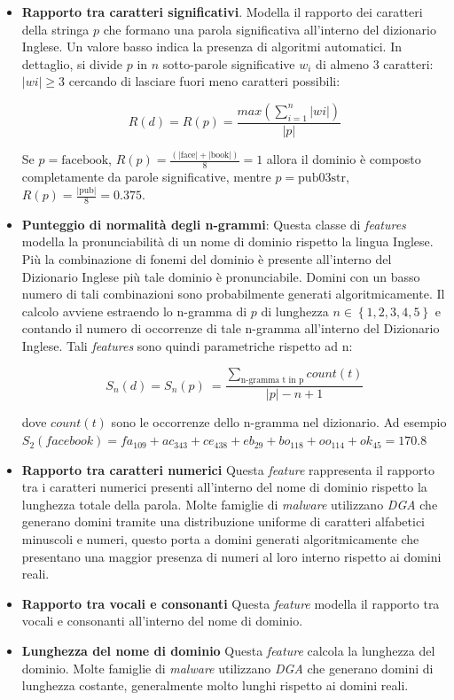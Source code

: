 \begin{itemize}

\item \textbf{Rapporto tra caratteri significativi}. Modella il rapporto dei caratteri della stringa $p$ che formano una parola significativa all'interno del dizionario Inglese. Un valore basso indica la presenza di algoritmi automatici. In dettaglio, si divide $p$ in $n$ sotto-parole significative $w_i$ di almeno $3$ caratteri: $|wi| \ge 3$ cercando di lasciare fuori meno caratteri possibili: 

\[R(d) = R(p) = \frac{max(\sum_{i=1}^n |wi|)}{\left | p \right |}\] 

Se $p = \text{facebook}$, $R(p) = \frac{(|\text{face}| + |\text{book}|)}{8} = 1$ allora il dominio è composto completamente da parole significative, mentre $p = \text{pub03str}$, $R(p) = \frac{|\text{pub}|}{8} = 0.375$. 

    

\item \textbf{Punteggio di normalità degli n-grammi}: Questa classe di \textit{features} modella la pronunciabilità di un nome di dominio rispetto la lingua Inglese. Più la combinazione di fonemi del dominio è presente  all'interno del Dizionario Inglese più tale dominio è pronunciabile. Domini con un basso numero di tali combinazioni sono probabilmente generati algoritmicamente. Il calcolo avviene estraendo lo n-gramma di $p$ di lunghezza $n \in \left \{1, 2, 3, 4, 5 \right \}$ e contando il numero di occorrenze di tale n-gramma all'interno del Dizionario Inglese. Tali \textit{features} sono quindi parametriche rispetto ad n:
 
\[S_n(d) = S_n(p) \:= \frac{\sum_{\text{n-gramma t in p}} count(t)}{\left | p \right | - n + 1}\] 

dove $count(t)$ sono le occorrenze dello n-gramma nel dizionario. Ad esempio $S_2(facebook) = fa_{109} + ac_{343} + ce_{438} + eb_{29} + bo_{118} + oo_{114} + ok_{45} = 170.8$

       
\item \textbf{Rapporto tra caratteri numerici} Questa \textit{feature} rappresenta il rapporto tra i caratteri numerici presenti all'interno del nome di dominio rispetto la lunghezza totale della parola. Molte famiglie di \textit{malware} utilizzano \textit{DGA} che generano domini tramite una distribuzione uniforme di caratteri alfabetici minuscoli e numeri, questo porta a domini generati algoritmicamente che presentano una maggior presenza di numeri al loro interno rispetto ai domini reali.


\item \textbf{Rapporto tra vocali e consonanti} Questa \textit{feature} modella il rapporto tra vocali e consonanti all'interno del nome di dominio.


\item \textbf{Lunghezza del nome di dominio} Questa \textit{feature} calcola la lunghezza del dominio. Molte famiglie di \textit{malware} utilizzano \textit{DGA} che generano domini di lunghezza costante, generalmente molto lunghi rispetto ai domini reali.
	
\end{itemize}

